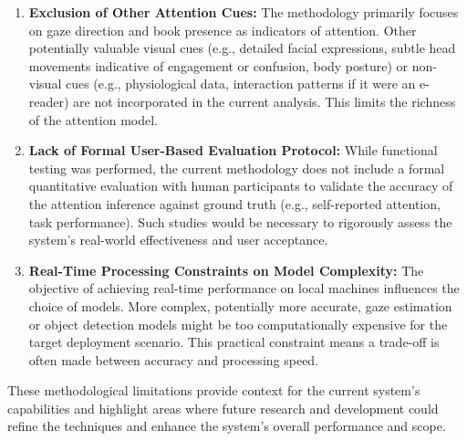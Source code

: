 \begin{enumerate}
    \item \textbf{Exclusion of Other Attention Cues:}
    The methodology primarily focuses on gaze direction and book presence as indicators of attention. Other potentially valuable visual cues (e.g., detailed facial expressions, subtle head movements indicative of engagement or confusion, body posture) or non-visual cues (e.g., physiological data, interaction patterns if it were an e-reader) are not incorporated in the current analysis. This limits the richness of the attention model.

    \item \textbf{Lack of Formal User-Based Evaluation Protocol:}
    While functional testing was performed, the current methodology does not include a formal quantitative evaluation with human participants to validate the accuracy of the attention inference against ground truth (e.g., self-reported attention, task performance). Such studies would be necessary to rigorously assess the system's real-world effectiveness and user acceptance.

    \item \textbf{Real-Time Processing Constraints on Model Complexity:}
    The objective of achieving real-time performance on local machines influences the choice of models. More complex, potentially more accurate, gaze estimation or object detection models might be too computationally expensive for the target deployment scenario. This practical constraint means a trade-off is often made between accuracy and processing speed.
\end{enumerate}
These methodological limitations provide context for the current system's capabilities and highlight areas where future research and development could refine the techniques and enhance the system's overall performance and scope.